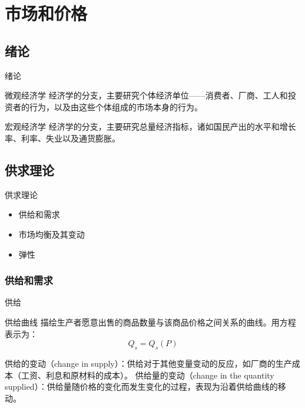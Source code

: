 \documentclass[UTF8]{ctexbeamer}
\begin{document}
\section{市场和价格}

\subsection{绪论}
\begin{frame}{绪论}
\begin{block}{微观经济学}
经济学的分支，主要研究个体经济单位——消费者、厂商、工人和投资者的行为，以及由这些个体组成的市场本身的行为。
\end{block}
\begin{block}{宏观经济学}
经济学的分支，主要研究总量经济指标，诸如国民产出的水平和增长率、利率、失业以及通货膨胀。
\end{block}
\end{frame}

\subsection{供求理论}
\begin{frame}{供求理论}
\linespread{1.5}
\begin{itemize}
\item 供给和需求
\item 市场均衡及其变动
\item 弹性
\end{itemize}
\end{frame}

\subsubsection{供给和需求}
\begin{frame}{供给}
\begin{block}{供给曲线}
描绘生产者愿意出售的商品数量与该商品价格之间关系的曲线。\newline 用方程表示为：
\begin{equation*}
Q_s = Q_s(P) 
\end{equation*}
\end{block}

供给的变动（change in supply）：供给对于其他变量变动的反应，如厂商的生产成本（工资、利息和原材料的成本）。  \newline
供给量的变动（change in the quantity supplied）：供给量随价格的变化而发生变化的过程，表现为沿着供给曲线的移动。
\end{frame}
\end{document}
